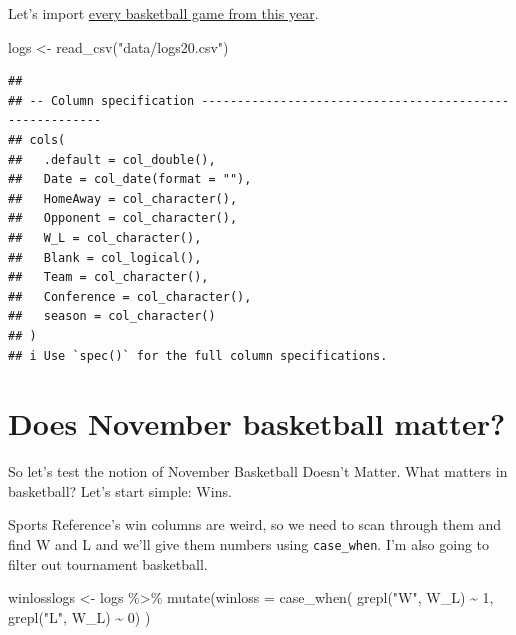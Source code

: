 \documentclass[
]{book}
\newenvironment{Shaded}{\begin{snugshade}}{\end{snugshade}}
\newcommand{\AttributeTok}[1]{\textcolor[rgb]{0.77,0.63,0.00}{#1}}
\newcommand{\DecValTok}[1]{\textcolor[rgb]{0.00,0.00,0.81}{#1}}
\newcommand{\FunctionTok}[1]{\textcolor[rgb]{0.00,0.00,0.00}{#1}}
\newcommand{\NormalTok}[1]{#1}
\newcommand{\OtherTok}[1]{\textcolor[rgb]{0.56,0.35,0.01}{#1}}
\newcommand{\SpecialCharTok}[1]{\textcolor[rgb]{0.00,0.00,0.00}{#1}}
\newcommand{\StringTok}[1]{\textcolor[rgb]{0.31,0.60,0.02}{#1}}
\begin{document}
Let's import \href{https://unl.box.com/s/wnlh0u9low1yh56enion8zjmu8r7dc8p}{every basketball game from this year}.

\begin{Shaded}
\begin{Highlighting}[]
\NormalTok{logs }\OtherTok{\textless{}{-}} \FunctionTok{read\_csv}\NormalTok{(}\StringTok{"data/logs20.csv"}\NormalTok{)}
\end{Highlighting}
\end{Shaded}

\begin{verbatim}
## 
## -- Column specification --------------------------------------------------------
## cols(
##   .default = col_double(),
##   Date = col_date(format = ""),
##   HomeAway = col_character(),
##   Opponent = col_character(),
##   W_L = col_character(),
##   Blank = col_logical(),
##   Team = col_character(),
##   Conference = col_character(),
##   season = col_character()
## )
## i Use `spec()` for the full column specifications.
\end{verbatim}

\hypertarget{does-november-basketball-matter}{%
\section{Does November basketball matter?}\label{does-november-basketball-matter}}

So let's test the notion of November Basketball Doesn't Matter. What matters in basketball? Let's start simple: Wins.

Sports Reference's win columns are weird, so we need to scan through them and find W and L and we'll give them numbers using \texttt{case\_when}. I'm also going to filter out tournament basketball.

\begin{Shaded}
\begin{Highlighting}[]
\NormalTok{winlosslogs }\OtherTok{\textless{}{-}}\NormalTok{ logs }\SpecialCharTok{\%\textgreater{}\%} \FunctionTok{mutate}\NormalTok{(}\AttributeTok{winloss =} \FunctionTok{case\_when}\NormalTok{(}
  \FunctionTok{grepl}\NormalTok{(}\StringTok{"W"}\NormalTok{, W\_L) }\SpecialCharTok{\textasciitilde{}} \DecValTok{1}\NormalTok{, }
  \FunctionTok{grepl}\NormalTok{(}\StringTok{"L"}\NormalTok{, W\_L) }\SpecialCharTok{\textasciitilde{}} \DecValTok{0}\NormalTok{)}
\NormalTok{) }
\end{Highlighting}
\end{Shaded}
\end{document}

